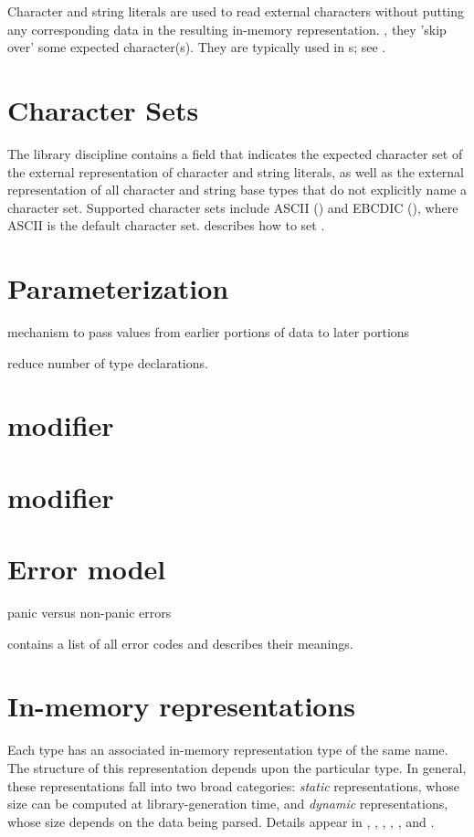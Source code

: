Character and string literals are used to read external characters
without putting any corresponding data in the resulting in-memory representation.
\Ie, they 'skip over' some expected character(s).
They are typically used in \Pstruct{}s; see .

\section{Character Sets}
\label{sec:common-character-sets}

The library discipline contains a field  that
indicates the expected character set of the external representation of
character and string literals, as well as the external representation of all character and string
base types that do not explicitly name a character set.  Supported
character sets include ASCII () and EBCDIC
(), where ASCII is the default character set.
 describes how
to set .

\section{Parameterization}
\label{sec:common-parameterization}
 mechanism to pass values from earlier portions of data to later
 portions
 
 reduce number of type declarations.


\section{\Precord{} modifier}

\section{\Pfile{} modifier}

\section{Error model}
\label{sec:common-error-model}
 panic versus non-panic errors

 contains a list of all error codes and
describes their meanings.

\section{In-memory representations}
\label{sec:common-rep}
Each \PADS{} type  has an associated in-memory representation
type of the same name.  The structure of this representation depends
upon the particular \PADS{} type.  
In general, these representations fall into two broad categories:
\textit{static} representations, whose size can be computed at
library-generation time, and \textit{dynamic} representations, whose size 
depends on the data being parsed. 
Details appear in 
, ,
, , 
, and .

